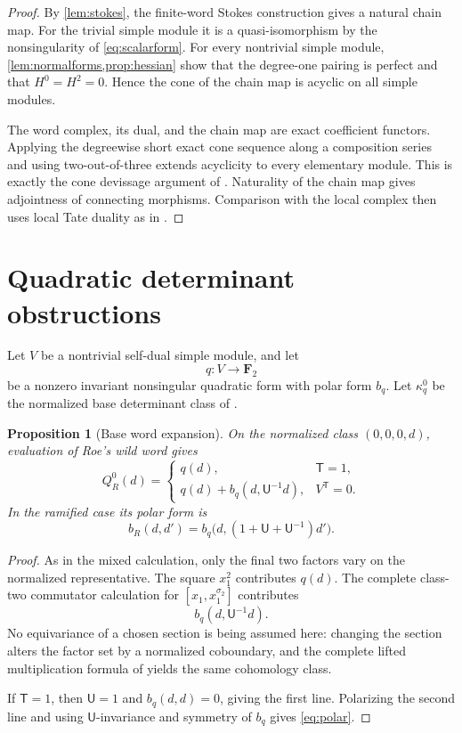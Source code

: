 \documentclass[11pt]{article}
\numberwithin{equation}{section}
\newtheorem{proposition}[theorem]{Proposition}
\theoremstyle{definition}
\theoremstyle{remark}
\newcommand{\F}{\mathbf F}
\begin{document}
\begin{proof}
By \cref{lem:stokes}, the finite-word Stokes construction gives a natural
chain map.  For the trivial simple module it is a quasi-isomorphism by the
nonsingularity of \cref{eq:scalarform}.  For every nontrivial simple module,
\cref{lem:normalforms,prop:hessian} show that the degree-one pairing is
perfect and that \(H^0=H^2=0\).  Hence the cone of the chain map is acyclic
on all simple modules.

The word complex, its dual, and the chain map are exact coefficient
functors.  Applying the degreewise short exact cone sequence along a
composition series and using two-out-of-three extends acyclicity to every
elementary module.  This is exactly the cone devissage argument of
\cite[Lemma~5.11 and Proposition~5.15]{RT}.  Naturality of the chain map
gives adjointness of connecting morphisms.  Comparison with the local
complex then uses local Tate duality as in
\cite[Proposition~5.16 and Corollary~5.17]{RT}.
\end{proof}

\section{Quadratic determinant obstructions}

Let \(V\) be a nontrivial self-dual simple module, and let
\[
  q:V\longrightarrow\F_2
\]
be a nonzero invariant nonsingular quadratic form with polar form \(b_q\).
Let \(\kappa_q^0\) be the normalized base determinant class of
\cite[Lemma~6.3]{RT}.

\begin{proposition}[Base word expansion]\label{prop:quadratic}
On the normalized class \((0,0,0,d)\), evaluation of Roe's wild word gives
\begin{equation}\label{eq:QR}
  Q_R^0(d)=
  \begin{cases}
    q(d),&\mathsf T=1,\\[1mm]
    q(d)+b_q(d,\mathsf U^{-1}d),&V^{\mathsf T}=0.
  \end{cases}
\end{equation}
In the ramified case its polar form is
\begin{equation}\label{eq:polar}
  b_R(d,d')
  =b_q\bigl(d,(1+\mathsf U+\mathsf U^{-1})d'\bigr).
\end{equation}
\end{proposition}

\begin{proof}
As in the mixed calculation, only the final two factors vary on the
normalized representative.  The square \(x_1^2\) contributes \(q(d)\).
The complete class-two commutator calculation for
\([x_1,x_1^{\sigma_2}]\) contributes
\[
  b_q(d,\mathsf U^{-1}d).
\]
No equivariance of a chosen section is being assumed here: changing the
section alters the factor set by a normalized coboundary, and the complete
lifted multiplication formula of \cite[(6.8)]{RT} yields the same
cohomology class.

If \(\mathsf T=1\), then \(\mathsf U=1\) and
\(b_q(d,d)=0\), giving the first line.  Polarizing the second line and
using \(\mathsf U\)-invariance and symmetry of \(b_q\) gives
\cref{eq:polar}.
\end{proof}
\end{document}
